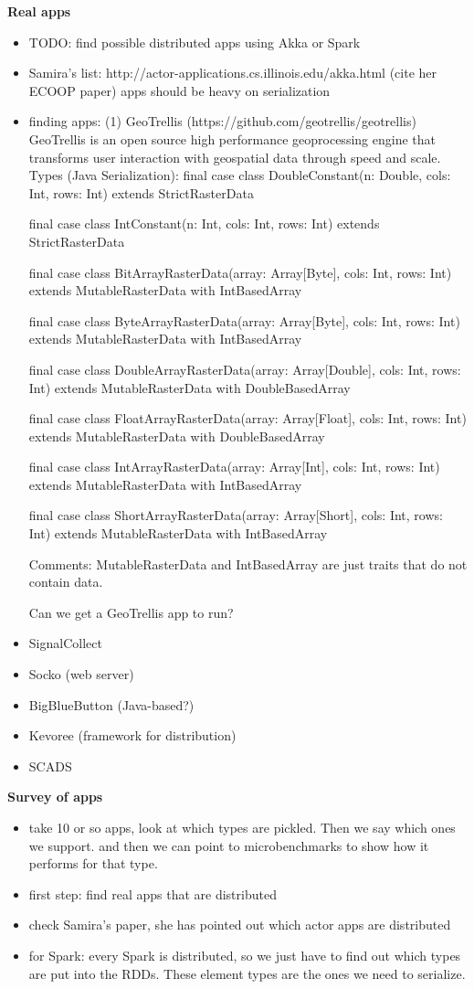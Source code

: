 \documentclass[preprint,10pt]{sigplanconf}
\theoremstyle{definition}
\begin{document}
{\bf Real apps}
\begin{itemize}
\item TODO: find possible distributed apps using Akka or Spark
\item Samira's list: http://actor-applications.cs.illinois.edu/akka.html (cite her ECOOP paper)
apps should be heavy on serialization
\item finding apps:
(1) GeoTrellis (https://github.com/geotrellis/geotrellis)
GeoTrellis is an open source high performance geoprocessing engine that transforms user interaction with geospatial data through speed and scale.
Types (Java Serialization):
final case class DoubleConstant(n: Double, cols: Int, rows: Int) extends StrictRasterData

final case class IntConstant(n: Int, cols: Int, rows: Int) extends StrictRasterData

final case class BitArrayRasterData(array: Array[Byte], cols: Int, rows: Int) extends MutableRasterData with IntBasedArray

final case class ByteArrayRasterData(array: Array[Byte], cols: Int, rows: Int) extends MutableRasterData with IntBasedArray

final case class DoubleArrayRasterData(array: Array[Double], cols: Int, rows: Int) extends MutableRasterData with DoubleBasedArray

final case class FloatArrayRasterData(array: Array[Float], cols: Int, rows: Int) extends MutableRasterData with DoubleBasedArray

final case class IntArrayRasterData(array: Array[Int], cols: Int, rows: Int) extends MutableRasterData with IntBasedArray

final case class ShortArrayRasterData(array: Array[Short], cols: Int, rows: Int) extends MutableRasterData with IntBasedArray

Comments: MutableRasterData and IntBasedArray are just traits that do not contain data.

Can we get a GeoTrellis app to run?

\item SignalCollect
\item Socko (web server)
\item BigBlueButton (Java-based?)
\item Kevoree (framework for distribution)
\item SCADS
\end{itemize}

{\bf Survey of apps}

\begin{itemize}
\item take 10 or so apps, look at which types are pickled. Then we say which ones we support. and then we can point to microbenchmarks to show how it performs for that type.
\item first step: find real apps that are distributed
\item check Samira's paper, she has pointed out which actor apps are distributed
\item for Spark: every Spark is distributed, so we just have to find out which types are put into the RDDs. These element types are the ones we need to serialize.
\end{itemize}
\end{document}
